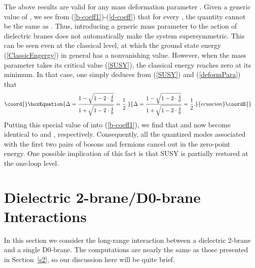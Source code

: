 \documentclass[a4paper,12pt]{article}
\begin{document}
{The above results are valid for any mass deformation parameter \myHighlight{$\Delta\in[0,1]$}\coordHE{}. Given a generic value of \myHighlight{$\Delta$}\coordHE{}, we see from (\ref{b-coeff1})-(\ref{d-coeff}) that for every \coordHE{}, the quantity \coordHE{} cannot be the same as \coordHE{}. Thus, introducing a generic mass parameter to the action of dielectric branes does not automatically make the system supersymmetric. This can be seen even at the classical level,  at which the ground state energy (\ref{ClassicEngergy}) in general has a nonvanishing value. However, when the mass parameter takes its critical value (\ref{SUSY}), the classical energy reaches zero at its minimum. In that case,  one simply deduces from (\ref{SUSY}) and (\ref{deformPara}) that 
\begin{equation}\coord{}\boxEquation{
\Delta=\frac{1-\sqrt{1-2\cdot\frac{4}{9}}}{1+\sqrt{1-2\cdot\frac{4}{9}}}=\frac{1}{2}.
}{
\Delta=\frac{1-\sqrt{1-2\cdot\frac{4}{9}}}{1+\sqrt{1-2\cdot\frac{4}{9}}}=\frac{1}{2}.
}{ecuacion}\coordE{}\end{equation}
Putting this special value of \myHighlight{$\Delta$}\coordHE{} into (\ref{b-coeff1}), we find that \coordHE{} and \coordHE{} now become identical to \coordHE{} and \coordHE{}, respectively. Consequently, all the quantized modes associated with the first two pairs of bosons and fermions cancel out in the zero-point energy. One possible implication of this fact is that SUSY is partially restored at the one-loop level.
\section{Dielectric 2-brane/D0-brane Interactions} \label{s4}
In this section we consider the long-range interaction between a dielectric 2-brane and a single D0-brane. The computations are nearly the same as those presented in Section~\ref{s2}, so our discussion here will be quite brief.

}
\end{document}
